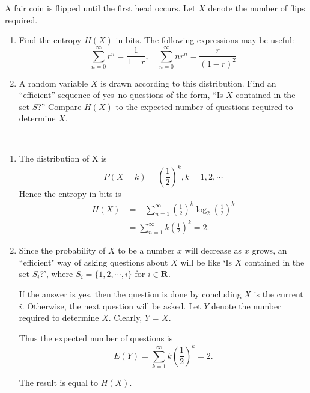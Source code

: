 \begin{exercise}  { A fair coin is flipped until the first head occurs. Let $X$ denote the number of flips required. 
\begin{enumerate}
\item Find the entropy $H(X)$ in bits. The following expressions may be useful:
\begin{equation}
\sum_{n=0}^{\infty} r^{n}=\frac{1}{1-r}, \quad \sum_{n=0}^{\infty} n r^{n}=\frac{r}{(1-r)^{2}}
\end{equation}

\item A random variable $X$ is drawn according to this distribution. Find an “efficient” sequence of yes–no questions of the form, “Is $X$ contained in the set $S$?” Compare $H(X)$ to the expected number of questions required to determine $X$.
\end{enumerate}
}


\begin{solution}
\par{~}
\begin{enumerate}
    \item The distribution of X is $$P(X = k) = (\frac{1}{2})^k, k = 1,2,\cdots$$
    Hence the entropy in bits is
    \begin{equation}
        \begin{aligned}
            H(X) &= - \sum_{n=1}^{\infty}\left(\frac{1}{2}\right)^{k} \log_{2} \left(\frac{1}{2}\right)^{k} \\
            &= \sum_{n=1}^{\infty}k\left(\frac{1}{2}\right)^k = 2.
        \end{aligned}
    \end{equation}

    \item Since the probability of $X$ to be a number $x$ will decrease as $x$ grows, an ``efficient" way of asking questions about $X$ will be like `Is $X$ contained in the set $S_i$?', where $S_i = \{1,2,\cdots,i\}$ for $i \in \mathbf{R}$.
    
    If the answer is yes, then the question is done by concluding $X$ is the current $i$. Otherwise, the next question will be asked. Let $Y$ denote the number required to determine $X$. Clearly, $Y$ = $X$.
    
    Thus the expected number of questions is
    $$E(Y) = \sum_{k=1}^{\infty}k(\frac{1}{2})^k = 2.$$

    The result is equal to $H(X)$.

\end{enumerate}

\end{solution}
\end{exercise}

